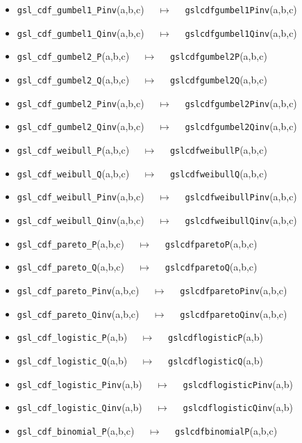 \documentclass[a4paper,twoside,12pt]{book}
\begin{document}
{\begin{itemize}
\item \texttt{gsl\_cdf\_gumbel1\_Pinv}(a,b,c) $\quad \mapsto\quad $ \texttt{gslcdfgumbel1Pinv}(a,b,c) 
\item \texttt{gsl\_cdf\_gumbel1\_Qinv}(a,b,c) $\quad \mapsto\quad $ \texttt{gslcdfgumbel1Qinv}(a,b,c) 
\item \texttt{gsl\_cdf\_gumbel2\_P}(a,b,c) $\quad \mapsto\quad $ \texttt{gslcdfgumbel2P}(a,b,c) 
\item \texttt{gsl\_cdf\_gumbel2\_Q}(a,b,c) $\quad \mapsto\quad $ \texttt{gslcdfgumbel2Q}(a,b,c) 
\item \texttt{gsl\_cdf\_gumbel2\_Pinv}(a,b,c) $\quad \mapsto\quad $ \texttt{gslcdfgumbel2Pinv}(a,b,c) 
\item \texttt{gsl\_cdf\_gumbel2\_Qinv}(a,b,c) $\quad \mapsto\quad $ \texttt{gslcdfgumbel2Qinv}(a,b,c) 
\item \texttt{gsl\_cdf\_weibull\_P}(a,b,c) $\quad \mapsto\quad $ \texttt{gslcdfweibullP}(a,b,c) 
\item \texttt{gsl\_cdf\_weibull\_Q}(a,b,c) $\quad \mapsto\quad $ \texttt{gslcdfweibullQ}(a,b,c) 
\item \texttt{gsl\_cdf\_weibull\_Pinv}(a,b,c) $\quad \mapsto\quad $ \texttt{gslcdfweibullPinv}(a,b,c) 
\item \texttt{gsl\_cdf\_weibull\_Qinv}(a,b,c) $\quad \mapsto\quad $ \texttt{gslcdfweibullQinv}(a,b,c) 
\item \texttt{gsl\_cdf\_pareto\_P}(a,b,c) $\quad \mapsto\quad $ \texttt{gslcdfparetoP}(a,b,c) 
\item \texttt{gsl\_cdf\_pareto\_Q}(a,b,c) $\quad \mapsto\quad $ \texttt{gslcdfparetoQ}(a,b,c) 
\item \texttt{gsl\_cdf\_pareto\_Pinv}(a,b,c) $\quad \mapsto\quad $ \texttt{gslcdfparetoPinv}(a,b,c) 
\item \texttt{gsl\_cdf\_pareto\_Qinv}(a,b,c) $\quad \mapsto\quad $ \texttt{gslcdfparetoQinv}(a,b,c) 
\item \texttt{gsl\_cdf\_logistic\_P}(a,b) $\quad \mapsto\quad $ \texttt{gslcdflogisticP}(a,b) 
\item \texttt{gsl\_cdf\_logistic\_Q}(a,b) $\quad \mapsto\quad $ \texttt{gslcdflogisticQ}(a,b) 
\item \texttt{gsl\_cdf\_logistic\_Pinv}(a,b) $\quad \mapsto\quad $ \texttt{gslcdflogisticPinv}(a,b) 
\item \texttt{gsl\_cdf\_logistic\_Qinv}(a,b) $\quad \mapsto\quad $ \texttt{gslcdflogisticQinv}(a,b) 
\item \texttt{gsl\_cdf\_binomial\_P}(a,b,c) $\quad \mapsto\quad $ \texttt{gslcdfbinomialP}(a,b,c) 

\end{itemize}}
\end{document}
